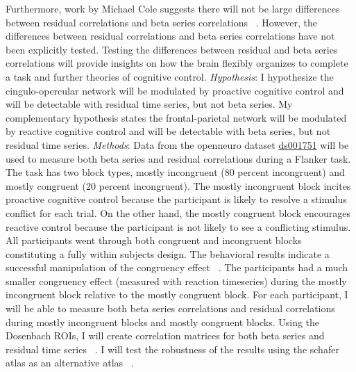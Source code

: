 \documentclass[phd,appendix,figures]{uithesis}
\begin{document}
Furthermore, work by Michael Cole suggests there will not be large differences between residual correlations and beta series correlations ~\citep{Cole2019}.
However, the differences between residual correlations and beta series correlations have not been explicitly tested.
Testing the differences between residual and beta series correlations will provide insights on how the brain flexibly organizes to complete a task and further theories of cognitive control.
\newline
\newline
\textit{Hypothesis}:
I hypothesize the cingulo-opercular network will be modulated by proactive cognitive control and will be detectable with residual time series, but not beta series.
My complementary hypothesis states the frontal-parietal network will be modulated by reactive cognitive control and will be detectable with beta series, but not residual time series. 
\newline
\newline
\textit{Methods}:
Data from the openneuro dataset \href{https://openneuro.org/datasets/ds001751/versions/1.0.0}{ds001751} will be used to measure both beta series and residual correlations during a Flanker task.
The task has two block types, mostly incongruent (80 percent incongruent) and mostly congruent (20 percent incongruent).
The mostly incongruent block incites proactive cognitive control because the participant is likely to resolve a stimulus conflict for each trial.
On the other hand, the mostly congruent block encourages reactive control because the participant is not likely to see a conflicting stimulus.
All participants went through both congruent and incongruent blocks constituting a fully within subjects design.
The behavioral results indicate a successful manipulation of the congruency effect ~\citep{Aben2019}.
The participants had a much smaller congruency effect (measured with reaction timeseries) during the mostly incongruent block relative to the mostly congruent block.
For each participant, I will be able to measure both beta series correlations and residual correlations during mostly incongruent blocks and mostly congruent blocks. 
Using the Dosenbach ROIs, I will create correlation matrices for both beta series and residual time series ~\citep{Dosenbach2010}.
I will test the robustness of the results using the schafer atlas as an alternative atlas ~\citep{schaefer2017}.
\end{document}
